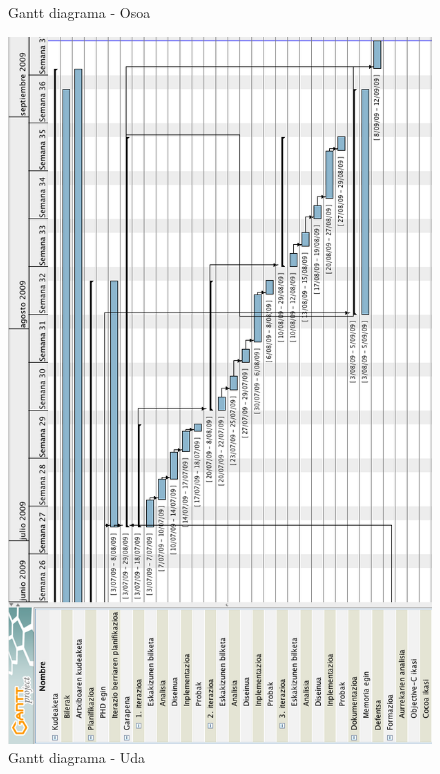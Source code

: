 \begin{figure}[htp]
\begin{center}
\caption{Gantt diagrama - Osoa}
\label{gantt.osoa}
\end{center}
\end{figure}

\begin{figure}[htp]
\begin{center}
\includegraphics[scale=0.5]{Pictures/Chapter3/Gantt-txikia.png}
\caption{Gantt diagrama - Uda}
\label{gantt.txikia}
\end{center}
\end{figure}

